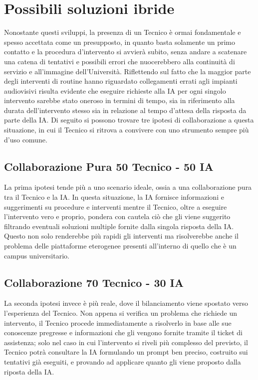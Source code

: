         \section{Possibili soluzioni ibride}
            \par
                Nonostante questi sviluppi, la presenza di un Tecnico è ormai fondamentale e spesso accettata come un presupposto, in quanto basta solamente un primo contatto e la procedura d'intervento si avvierà subito, senza andare a scatenare una catena di tentativi e possibili errori che nuocerebbero alla continuità di servizio e all'immagine dell'Università. \newline 
                Riflettendo sul fatto che la maggior parte degli interventi di routine hanno riguardato collegamenti errati agli impianti audiovisivi risulta evidente che eseguire richieste alla IA per ogni singolo intervento sarebbe stato oneroso in termini di tempo, sia in riferimento alla durata dell'intervento stesso sia in relazione al tempo d'attesa della risposta da parte della IA. \newline
                Di seguito si possono trovare tre ipotesi di collaborazione a questa situazione, in cui il Tecnico si ritrova a convivere con uno strumento sempre più d'uso comune. 
            \subsection*{Collaborazione Pura 50 Tecnico - 50 IA}
                La prima ipotesi tende più a uno scenario ideale, ossia a una collaborazione pura tra il Tecnico e la IA. In questa situazione, la IA fornisce informazioni e suggerimenti su procedure e interventi mentre il Tecnico, oltre a eseguire l'intervento vero e proprio, pondera con cautela ciò che gli viene suggerito filtrando eventuali soluzioni multiple fornite dalla singola risposta della IA. Questo non solo renderebbe più rapidi gli interventi ma risolverebbe anche il problema delle piattaforme eterogenee presenti all'interno di quello che è un campus universitario.
            \subsection*{Collaborazione 70 Tecnico - 30 IA}
                La seconda ipotesi invece è più reale, dove il bilanciamento viene spostato verso l'esperienza del Tecnico. Non appena si verifica un problema che richiede un intervento, il Tecnico procede immediatamente a risolverlo in base alle sue conoscenze pregresse e informazioni che gli vengono fornite tramite il ticket di assistenza; solo nel caso in cui l'intervento si riveli più complesso del previsto, il Tecnico potrà consultare la IA formulando un prompt ben preciso, costruito sui tentativi già eseguiti, e provando ad applicare quanto gli viene proposto dalla riposta della IA. 
